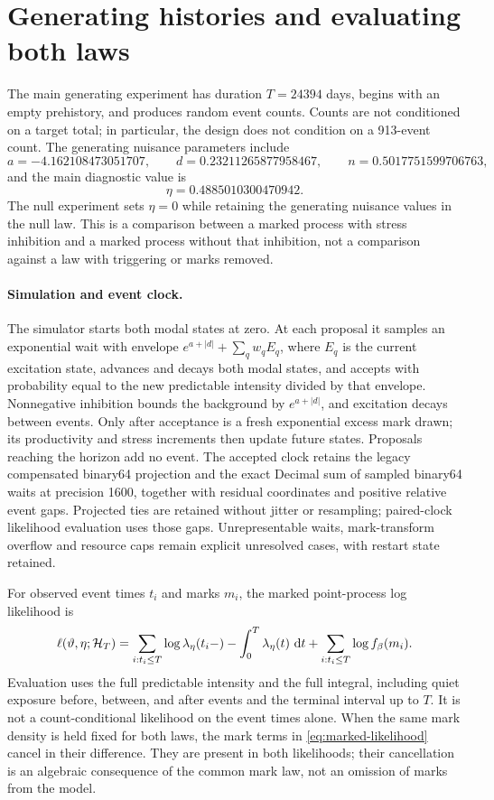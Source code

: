 \section{Generating histories and evaluating both laws}

The main generating experiment has duration \(T=24394\) days, begins with an empty prehistory, and produces random event counts. Counts are not conditioned on a target total; in particular, the design does not condition on a 913-event count. The generating nuisance parameters include
\[
a=-4.162108473051707,\qquad
d=0.23211265877958467,\qquad
n=0.5017751599706763,
\]
and the main diagnostic value is
\[
\eta=0.4885010300470942.
\]
The null experiment sets \(\eta=0\) while retaining the generating nuisance values in the null law. This is a comparison between a marked process with stress inhibition and a marked process without that inhibition, not a comparison against a law with triggering or marks removed.

\paragraph{Simulation and event clock.}
The simulator starts both modal states at zero. At each proposal it samples an exponential wait with envelope \(e^{a+|d|}+\sum_qw_qE_q\), where \(E_q\) is the current excitation state, advances and decays both modal states, and accepts with probability equal to the new predictable intensity divided by that envelope. Nonnegative inhibition bounds the background by \(e^{a+|d|}\), and excitation decays between events. Only after acceptance is a fresh exponential excess mark drawn; its productivity and stress increments then update future states. Proposals reaching the horizon add no event. The accepted clock retains the legacy compensated binary64 projection and the exact Decimal sum of sampled binary64 waits at precision 1600, together with residual coordinates and positive relative event gaps. Projected ties are retained without jitter or resampling; paired-clock likelihood evaluation uses those gaps. Unrepresentable waits, mark-transform overflow and resource caps remain explicit unresolved cases, with restart state retained.


For observed event times \(t_i\) and marks \(m_i\), the marked point-process log likelihood is
\begin{equation}
\ell(\vartheta,\eta;\mathcal H_T)
=
\sum_{i:t_i\le T}\log\lambda_\eta(t_i-)
-
\int_0^T\lambda_\eta(t)\,\mathop{}\!\mathrm{d} t
+
\sum_{i:t_i\le T}\log f_\beta(m_i).
\label{eq:marked-likelihood}
\end{equation}
Evaluation uses the full predictable intensity and the full integral, including quiet exposure before, between, and after events and the terminal interval up to \(T\). It is not a count-conditional likelihood on the event times alone. When the same mark density is held fixed for both laws, the mark terms in \eqref{eq:marked-likelihood} cancel in their difference. They are present in both likelihoods; their cancellation is an algebraic consequence of the common mark law, not an omission of marks from the model.

